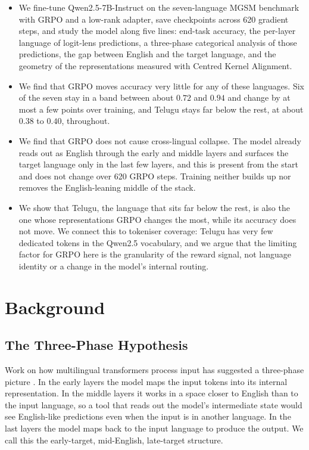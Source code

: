\begin{itemize}
	\item We fine-tune Qwen2.5-7B-Instruct on the seven-language MGSM benchmark with
	GRPO and a low-rank adapter, save checkpoints across 620 gradient steps, and
	study the model along five lines: end-task accuracy, the per-layer language of
	logit-lens predictions, a three-phase categorical analysis of those predictions,
	the gap between English and the target language, and the geometry of the
	representations measured with Centred Kernel Alignment.
	
	\item We find that GRPO moves accuracy very little for any of these languages.
	Six of the seven stay in a band between about $0.72$ and $0.94$ and change by at
	most a few points over training, and Telugu stays far below the rest, at about
	$0.38$ to $0.40$, throughout.
	
	\item We find that GRPO does not cause cross-lingual collapse. The model already
	reads out as English through the early and middle layers and surfaces the target
	language only in the last few layers, and this is present from the start and
	does not change over 620 GRPO steps. Training neither builds up nor removes the
	English-leaning middle of the stack.
	
	\item We show that Telugu, the language that sits far below the rest, is also the
	one whose representations GRPO changes the most, while its accuracy does not
	move. We connect this to tokeniser coverage: Telugu has very few dedicated tokens
	in the Qwen2.5 vocabulary, and we argue that the limiting factor for GRPO here is
	the granularity of the reward signal, not language identity or a change in the
	model's internal routing.
\end{itemize}

\section{Background}
\label{sec:grpo-background}

\subsection{The Three-Phase Hypothesis}
\label{subsec:grpo-wendler}

Work on how multilingual transformers process input has suggested a three-phase
picture \citep{wendler2024llamas}. In the early layers the model maps the input
tokens into its internal representation. In the middle layers it works in a space
closer to English than to the input language, so a tool that reads out the model's
intermediate state would see English-like predictions even when the input is in
another language. In the last layers the model maps back to the input language to
produce the output. We call this the early-target, mid-English, late-target
structure.

